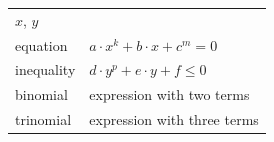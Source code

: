 {{\begin{center}
\begin{xtabular}[t]{|l|l|}
        $x$, $y$%
     \tabularnewline{}
        equation &
                  $a\ensuremath{\cdot}{x}^{k}+b\ensuremath{\cdot}x+{c}^{m}=0$
     \tabularnewline{}
        inequality &
                  $d\ensuremath{\cdot}{y}^{p}+e\ensuremath{\cdot}y+f\le 0$
     \tabularnewline{}
        binomial &
        expression with two terms%
     \tabularnewline{}
        trinomial &
        expression with three terms%

\end{xtabular}
\end{center}}}
